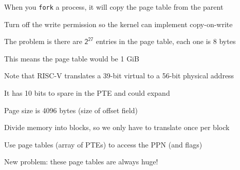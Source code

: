 \begin{slide}


    When you \texttt{fork} a process, it will copy the page table from the parent

    \leftspace{}Turn off the write permission so the kernel can implement
    copy-on-write
    \medskip

    The problem is there are $\mathsf{2^{27}}$ entries in the page table, each
    one is 8 bytes

    \leftspace{}This means the page table would be 1 GiB
    \medskip

    Note that RISC-V translates a 39-bit virtual to a 56-bit physical address

    \leftspace{}It has 10 bits to spare in the PTE and could expand

    \leftspace{}Page size is 4096 bytes (size of offset field)

\end{slide}

\begin{slide}


    Divide memory into blocks, so we only have to translate once per block
    \medskip

    Use page tables (array of PTEs) to access the PPN (and flags)
    \medskip

    New problem: these page tables are always huge!

\end{slide}
  


